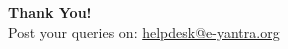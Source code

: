 \documentclass[table,10pt,red]{beamer}	%
\begin{document}

\begin{frame}
	\hskip4cm
	\textbf{\LARGE Thank You!} \\[20pt]
	\hskip3cm
	\scriptsize Post your queries on: 
	\hyperref[helpdesk@e-yantra.org]{\color{blue} helpdesk@e-yantra.org \color{black}} 
\end{frame}

\end{document}

